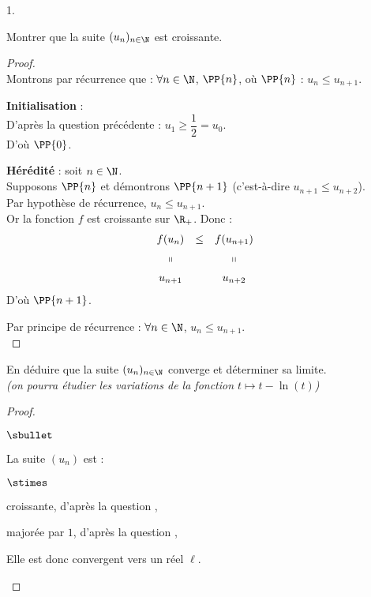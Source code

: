 \documentclass[11pt]{article}%
\begin{document}
\begin{noliste}{1.}
\item Montrer que la suite $(u_n)_{n\in \N}$ est croissante.

  \begin{proof}~\\
    Montrons par récurrence que : $\forall n\in\N$, $\PP{n}$, \quad où
    \quad $\PP{n}$ : $u_n\leq u_{n+1}$.
    \begin{noliste}{\fitem}
    \item {\bf Initialisation} : \\
      D'après la question 
      précédente : $u_1\geq \dfrac{1}{2} =u_0$.\\
      D'où $\PP{0}$.
      
    \item {\bf Hérédité} : soit $n\in\N$.\\
      Supposons $\PP{n}$ et démontrons $\PP{n+1}$ (c'est-à-dire
      $u_{n+1} \leq u_{n+2}$).\\
      Par hypothèse de récurrence, $u_n \leq u_{n+1}$.\\
      Or la fonction $f$ est croissante sur $\R_+$. Donc :
      \[
      \begin{array}{ccc}
        f(u_n) & \leq & f(u_{n+1})
        \\[.2cm]
        \shortparallel & & \shortparallel
        \\[.2cm]
        u_{n+1} & & u_{n+2}
      \end{array}
      \]
      D'où $\PP{n+1}$.
    \end{noliste}
    Par principe de récurrence : $\forall n\in\N$, $u_n\leq u_{n+1}$.%
    ~\\[-1cm]
  \end{proof}

\item En déduire que la suite $(u_n)_{n\in \N}$ converge et déterminer
  sa limite.\\
  {\it (on pourra étudier les variations de la fonction $t\mapsto
    t-\ln(t)$)}

\begin{proof}~
 \begin{noliste}{$\sbullet$}
  \item La suite $(u_n)$ est :
  \begin{noliste}{$\stimes$}
    \item croissante, d'après la question ,
    \item majorée par $1$, d'après la question ,
  \end{noliste}
  Elle est donc convergent vers un réel $\ell$.
  

\end{noliste}
\end{proof}
\end{noliste}
\end{document}
